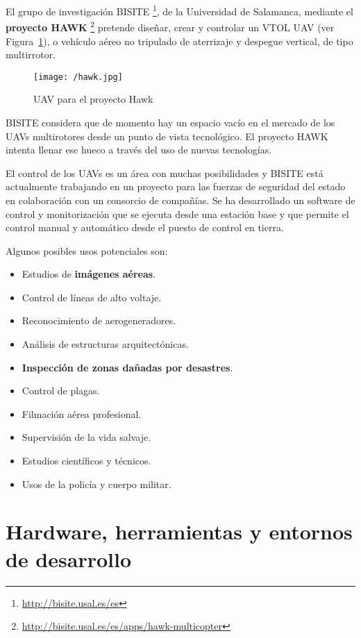 El grupo de investigación BISITE \footnote{\url{http://bisite.usal.es/es}}, de la Universidad de Salamanca, mediante el \textbf{proyecto HAWK} \footnote{\url{http://bisite.usal.es/es/apps/hawk-multicopter}} pretende diseñar, crear y controlar un \acs{VTOL} \acs{UAV} (ver Figura~\ref{fig:hawk}), o vehículo aéreo no tripulado de aterrizaje y despegue vertical, de tipo multirrotor.

\begin{figure}[!h]
\begin{center}
\texttt{[image: /hawk.jpg]}
\caption[\acs{UAV} para el proyecto Hawk]{\acs{UAV} para el proyecto Hawk}
\label{fig:hawk}
\end{center}
\end{figure}

BISITE considera que de momento hay un espacio vacío en el mercado de los \acs{UAV}s multirotores desde un punto de vista tecnológico. El proyecto HAWK intenta llenar ese hueco a través del uso de nuevas tecnologías. 

El control de los \acs{UAV}s es un área con muchas posibilidades y BISITE está actualmente trabajando en un proyecto para las fuerzas de seguridad del estado en colaboración con un consorcio de compañías. Se ha desarrollado un software de control y monitorización que se ejecuta desde una estación base y que permite el control manual y automático desde el puesto de control en tierra.

Algunos posibles usos potenciales son:
\begin{itemize}
\item Estudios de \textbf{imágenes aéreas}.
\item Control de líneas de alto voltaje.
\item Reconocimiento de aerogeneradores.
\item Análisis de estructuras arquitectónicas.
\item \textbf{Inspección de zonas dañadas por desastres}.
\item Control de plagas.
\item Filmación aérea profesional.
\item Supervisión de la vida salvaje.
\item Estudios científicos y técnicos.
\item Usos de la policía y cuerpo militar.
\end{itemize}

\section{Hardware, herramientas y entornos de desarrollo}
\label{sec:herramientas}


